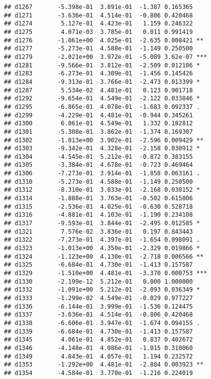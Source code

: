\documentclass[
]{article}
\begin{document}
\begin{verbatim}
## d1267       -5.398e-01  3.891e-01  -1.387 0.165365    
## d1271       -3.636e-01  4.514e-01  -0.806 0.420468    
## d1274        5.127e-01  4.423e-01   1.159 0.246322    
## d1275        4.071e-03  3.785e-01   0.011 0.991419    
## d1276       -1.061e+00  4.025e-01  -2.635 0.008421 ** 
## d1277       -5.273e-01  4.588e-01  -1.149 0.250500    
## d1279       -2.021e+00  3.972e-01  -5.089 3.62e-07 ***
## d1281       -9.566e-01  3.812e-01  -2.509 0.012106 *  
## d1283       -6.273e-01  4.309e-01  -1.456 0.145426    
## d1284       -9.313e-01  3.766e-01  -2.473 0.013399 *  
## d1287        5.534e-02  4.481e-01   0.123 0.901718    
## d1292       -9.654e-01  4.549e-01  -2.122 0.033846 *  
## d1295       -6.865e-01  4.078e-01  -1.683 0.092337 .  
## d1299       -4.229e-01  4.481e-01  -0.944 0.345261    
## d1300        6.061e-01  4.549e-01   1.332 0.182812    
## d1301       -5.308e-01  3.862e-01  -1.374 0.169307    
## d1302       -1.013e+00  3.902e-01  -2.596 0.009429 ** 
## d1303       -9.342e-01  4.328e-01  -2.158 0.030912 *  
## d1304       -4.545e-01  5.212e-01  -0.872 0.383155    
## d1305       -3.384e-01  4.678e-01  -0.723 0.469464    
## d1306       -7.273e-01  3.914e-01  -1.858 0.063161 .  
## d1310       -5.273e-01  4.588e-01  -1.149 0.250500    
## d1312       -8.310e-01  3.833e-01  -2.168 0.030152 *  
## d1314       -1.888e-01  3.763e-01  -0.502 0.615806    
## d1315       -2.536e-01  4.025e-01  -0.630 0.528718    
## d1316       -4.881e-01  4.103e-01  -1.190 0.234108    
## d1317       -9.593e-01  3.844e-01  -2.495 0.012585 *  
## d1321        7.576e-02  3.836e-01   0.197 0.843443    
## d1322       -7.273e-01  4.397e-01  -1.654 0.098091 .  
## d1323       -1.013e+00  4.350e-01  -2.329 0.019866 *  
## d1324       -1.123e+00  4.130e-01  -2.718 0.006566 ** 
## d1325       -6.684e-01  4.730e-01  -1.413 0.157587    
## d1329       -1.510e+00  4.481e-01  -3.370 0.000753 ***
## d1330       -2.199e-12  5.212e-01   0.000 1.000000    
## d1332       -1.091e+00  5.212e-01  -2.093 0.036349 *  
## d1333       -1.299e-02  4.549e-01  -0.029 0.977227    
## d1336       -6.144e-01  3.999e-01  -1.536 0.124475    
## d1337       -3.636e-01  4.514e-01  -0.806 0.420468    
## d1338       -6.606e-01  3.947e-01  -1.674 0.094155 .  
## d1339       -6.684e-01  4.730e-01  -1.413 0.157587    
## d1345        4.061e-01  4.852e-01   0.837 0.402672    
## d1346       -4.148e-01  4.086e-01  -1.015 0.310060    
## d1349        4.843e-01  4.057e-01   1.194 0.232572    
## d1353       -1.292e+00  4.481e-01  -2.884 0.003923 ** 
## d1354       -4.584e-01  3.770e-01  -1.216 0.224019    

\end{verbatim}
\end{document}
